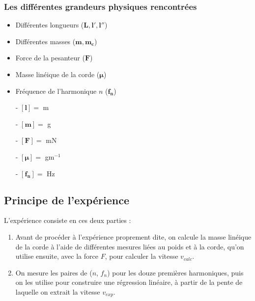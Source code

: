 \documentclass[12pt,a4paper]{article}
\begin{document}
    \subsubsection{Les différentes grandeurs physiques rencontrées}
    \begin{minipage}{0.6\linewidth}
        \begin{itemize}
            \item Différentes longueurs ($\bm{L, l', l''}$)
            \item Différentes masses ($\bm{m, m_c}$)
            \item Force de la pesanteur ($\bm{F}$)
            \item Masse linéique de la corde ($\bm{\mu}$)
            \item Fréquence de l'harmonique $n$ ($\bm{f_n}$)
        \end{itemize}
    \end{minipage}%
    \hfill
    \begin{minipage}{0.4\linewidth}
        \begin{itemize}
            \item[-] $\bm{[l]} =$ m
            \item[-] $\bm{[m]} =$ g
            \item[-] $\bm{[F]} =$ mN
            \item[-] $\bm{[\mu]} =$ gm$^{-1}$
            \item[-] $\bm{[f_n]} =$ Hz
        \end{itemize}   
    \end{minipage}

    \subsection{Principe de l'expérience}
    L'expérience consiste en ces deux parties :
    \begin{enumerate}
        \item Avant de procéder à l'expérience proprement dite, on calcule la masse linéique de la corde à l'aide de différentes mesures liées au poids et à la corde, qu'on utilise ensuite, avec la force $F$, pour calculer la vitesse $v_{calc}$.
        \item On mesure les paires de ($n$, $f_n$) pour les douze premières harmoniques, puis on les utilise pour construire une régression linéaire, à partir de la pente de laquelle on extrait la vitesse $v_{exp}$.
    \end{enumerate}
\end{document}
